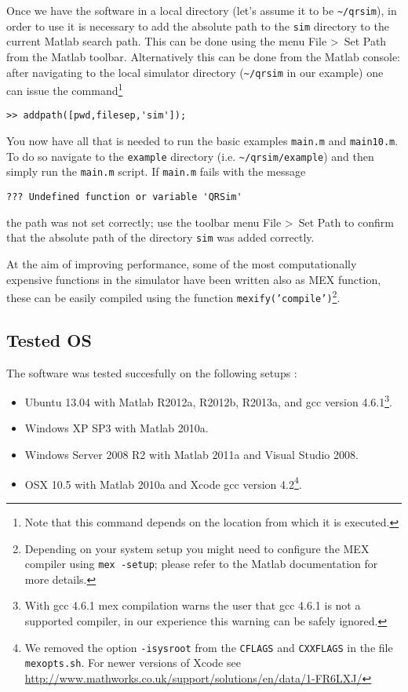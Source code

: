 \documentclass[a4paper,11pt]{report}
\begin{document}
Once we have the software in a local directory (let's assume it to be \texttt{\textasciitilde/qrsim}), in order to use it is necessary to add the absolute path to the \texttt{sim} directory to the current Matlab search path. 
This can be done using the menu \textsf{File \textgreater ~Set Path} from the Matlab toolbar. Alternatively this can be done from the Matlab console: after navigating to the local simulator directory (\texttt{\textasciitilde/qrsim} in our example) one can issue the command\footnote{Note that this command depends on the location from which it is executed.} 
\begin{verbatim}
>> addpath([pwd,filesep,'sim']);
\end{verbatim} 

You now have all that is needed to run the basic examples \texttt{main.m} and \texttt{main10.m}. 
To do so navigate to the \texttt{example} directory (i.e. \texttt{\textasciitilde/qrsim/example}) and then simply run the \texttt{main.m} script.
If \texttt{main.m} fails with the message 
\begin{verbatim}??? Undefined function or variable 'QRSim'\end{verbatim}
the path was not set correctly; use the toolbar menu \textsf{File \textgreater ~Set Path} to confirm that the absolute path of the directory \texttt{sim} was added correctly.

At the aim of improving performance, some of the most computationally expensive functions in the simulator have been written also as MEX function, these can be easily compiled using the function \texttt{mexify('compile')}\footnote{Depending on your system setup you might need to configure the MEX compiler using \texttt{mex -setup}; please refer to the Matlab documentation for more details.}.

\subsection{Tested OS} \label{sec:testedos}

The software was tested succesfully on the following setups :
\begin{itemize}
 \item Ubuntu 13.04 with Matlab R2012a, R2012b, R2013a, and gcc version 4.6.1\footnote{With gcc 4.6.1 mex compilation warns the user that gcc 4.6.1 is not a supported compiler, in our experience this warning can be safely ignored.}.
 \item Windows XP SP3 with Matlab 2010a.
 \item Windows Server 2008 R2 with Matlab 2011a and Visual Studio 2008.
 \item OSX 10.5 with Matlab 2010a and Xcode gcc version 4.2\footnote{We removed the option \texttt{-isysroot} from the \texttt{CFLAGS} and \texttt{CXXFLAGS} in the file \texttt{mexopts.sh}. For newer versions of Xcode see \url{http://www.mathworks.co.uk/support/solutions/en/data/1-FR6LXJ/}}.
\end{itemize}
\end{document}
